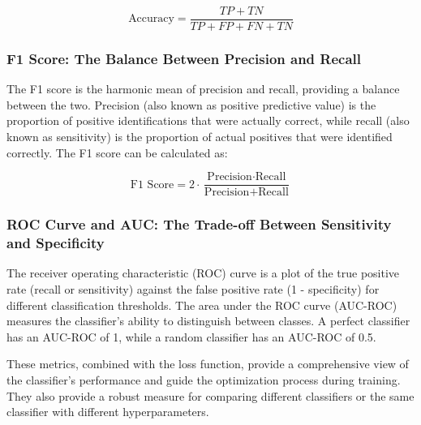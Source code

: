 \begin{equation}
    \text{Accuracy} = \frac{TP + TN}{TP + FP + FN + TN}
\end{equation}

\subsubsection{F1 Score: The Balance Between Precision and Recall}

The F1 score is the harmonic mean of precision and recall, providing a balance between the two. Precision (also known as
positive predictive value) is the proportion of positive identifications that were actually correct, while recall (also
known as sensitivity) is the proportion of actual positives that were identified correctly. The F1 score can be
calculated as:

\begin{equation}
    \text{F1 Score} = 2 \cdot \frac{\text{Precision} \cdot \text{Recall}}{\text{Precision} + \text{Recall}}
\end{equation}

\subsubsection{ROC Curve and AUC: The Trade-off Between Sensitivity and Specificity}

The receiver operating characteristic (ROC) curve is a plot of the true positive rate (recall or sensitivity) against
the false positive rate (1 - specificity) for different classification thresholds. The area under the ROC curve
(AUC-ROC) measures the classifier's ability to distinguish between classes. A perfect classifier has an AUC-ROC of 1,
while a random classifier has an AUC-ROC of 0.5.

These metrics, combined with the loss function, provide a comprehensive view of the classifier's performance and guide
the optimization process during training. They also provide a robust measure for comparing different classifiers or the
same classifier with different hyperparameters.